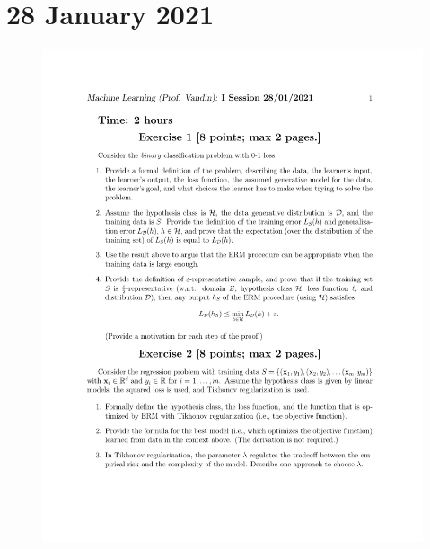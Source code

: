 \documentclass[a4paper,11pt,oneside]{book}
\begin{document}
\chapter{28 January 2021}

\begin{figure}[H]
    \centering
    \begin{minipage}{0.45\textwidth}
        \includegraphics[width=\textwidth,page=1]{images/28_Jan_2021.pdf}
    \end{minipage}
    \hfill
    \begin{minipage}{0.45\textwidth}

\end{minipage}
\end{figure}
\end{document}
